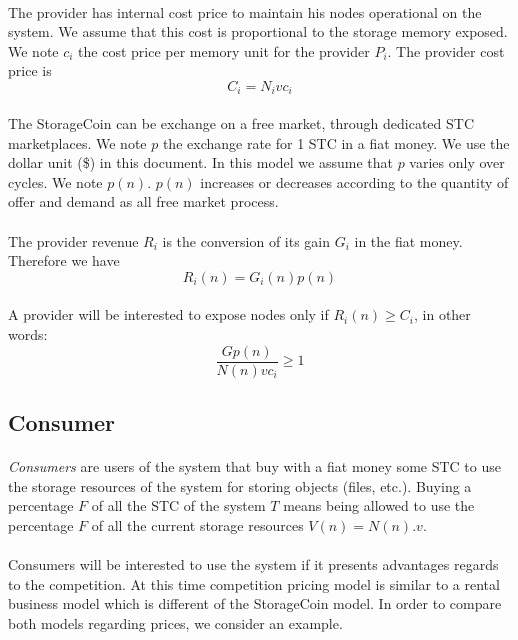 \documentclass[a4paper,12pt]{article}
\begin{document}
\paragraph*{}
The provider has internal cost price to maintain his nodes operational on the system. We assume that this cost is proportional to the storage memory exposed. We note $c_{i}$ the cost price per memory unit for the provider $P_{i}$. The provider cost price is
\[C_{i}=N_{i}vc_{i}\]

\paragraph*{}
The StorageCoin can be exchange on a free market, through dedicated STC marketplaces. We note $p$ the exchange rate for 1 STC in a fiat money. We use the dollar unit (\$) in this document.
In this model we assume that $p$ varies only over cycles. We note $p(n)$.
$p(n)$ increases or decreases according to the quantity of offer and demand as all free market process.

\paragraph*{}
The provider revenue $R_{i}$ is the conversion of its gain $G_{i}$ in the fiat money. Therefore we have 
\[R_{i}(n)=G_{i}(n)p(n)\]

\paragraph*{}
A provider will be interested to expose nodes only if 
$R_{i}(n)\ge{C_{i}}$, in other words: 
\[\frac{Gp(n)}{N(n)vc_{i}}\ge 1\] 

\subsection{Consumer}
\paragraph*{}
\emph{Consumers} are users of the system that buy with a fiat money some STC to use the storage resources of the system for storing objects (files, etc.). 
Buying a percentage $F$ of all the STC of the system $T$ means being allowed to use the percentage $F$ of all the current storage resources $V(n)=N(n).v$.

\paragraph*{}
Consumers will be interested to use the system if it presents advantages regards to the competition.
At this time competition pricing model is similar to a rental business model which is different of the StorageCoin model. 
In order to compare both models regarding prices, we consider an example.
\end{document}
